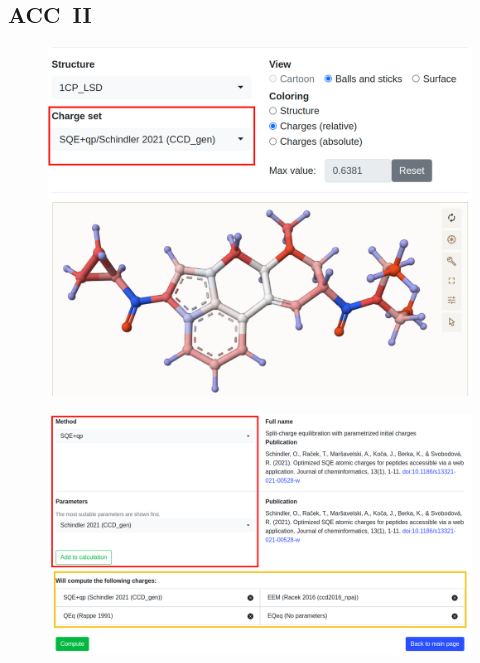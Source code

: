 \documentclass[
]{beamer}
\begin{document}
\subsection[ACC~II]{ACC~II}

\begin{frame}
  \begin{figure}
    \includegraphics[width=1\textwidth,height=\textheight,keepaspectratio]{images/acc2.png}
  \end{figure}
\end{frame}

\begin{frame}
  \begin{figure}
    \includegraphics[width=1\textwidth,height=\textheight,keepaspectratio]{images/new_setup.png}
  \end{figure}
\end{frame}
\end{document}
